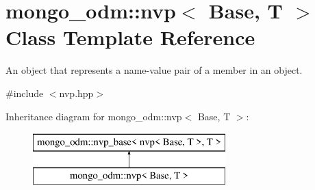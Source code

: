 \hypertarget{classmongo__odm_1_1nvp}{}\section{mongo\+\_\+odm\+:\+:nvp$<$ Base, T $>$ Class Template Reference}
\label{classmongo__odm_1_1nvp}


An object that represents a name-\/value pair of a member in an object.  




{\ttfamily \#include $<$nvp.\+hpp$>$}

Inheritance diagram for mongo\+\_\+odm\+:\+:nvp$<$ Base, T $>$\+:\begin{figure}[H]
\begin{center}
\leavevmode
\includegraphics[height=2.000000cm]{classmongo__odm_1_1nvp}
\end{center}
\end{figure}

